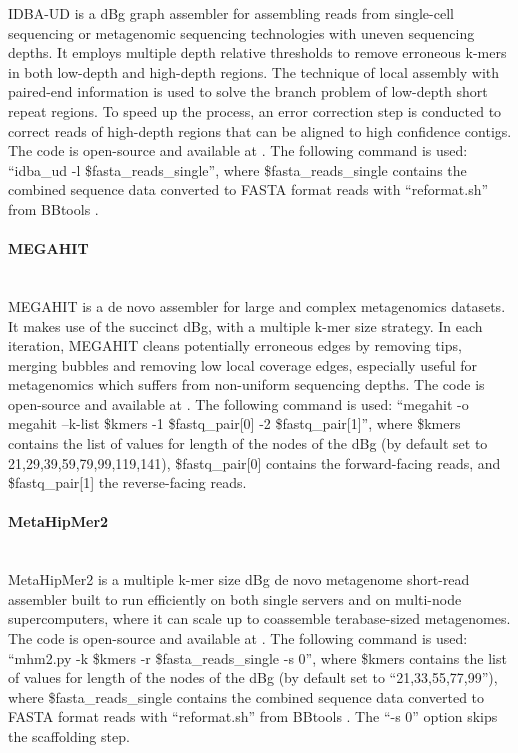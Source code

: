 IDBA-UD \cite{peng_idba-ud_2012} is a dBg graph assembler for assembling reads from single-cell sequencing or metagenomic sequencing technologies with uneven sequencing depths. It employs multiple depth relative thresholds to remove erroneous k-mers in both low-depth and high-depth regions. The technique of local assembly with paired-end information is used to solve the branch problem of low-depth short repeat regions. To speed up the process, an error correction step is conducted to correct reads of high-depth regions that can be aligned to high confidence contigs. The code is open-source and available at \cite{peng_loneknightpyidba_2022}. The following command is used:  “idba\_ud -l \$fasta\_reads\_single”, where \$fasta\_reads\_single contains the combined sequence data converted to FASTA format reads with “reformat.sh” from BBtools \cite{bushnell_bbmerge_2017}. 

\paragraph{MEGAHIT} \mbox{}\\

MEGAHIT \cite{li_megahit_2015} is a de novo assembler for large and complex metagenomics datasets. It makes use of the succinct dBg, with a multiple k-mer size strategy. In each iteration, MEGAHIT cleans potentially erroneous edges by removing tips, merging bubbles and removing low local coverage edges, especially useful for metagenomics which suffers from non-uniform sequencing depths. The code is open-source and available at \cite{li_megahit_2022}. The following command is used: “megahit -o megahit --k-list \$kmers -1 \$fastq\_pair[0] -2 \$fastq\_pair[1]”, where \$kmers contains the list of values for length of the nodes of the dBg (by default set to 21,29,39,59,79,99,119,141), \$fastq\_pair[0] contains the forward-facing reads, and \$fastq\_pair[1] the reverse-facing reads.

\paragraph{MetaHipMer2} \mbox{}\\

MetaHipMer2 \cite{georganas_extreme_2018} is a  multiple k-mer size dBg de novo metagenome short-read assembler built to run efficiently on both single servers and on multi-node supercomputers, where it can scale up to coassemble terabase-sized metagenomes. The code is open-source and available at \cite{noauthor_berkeleylab_nodate}. The following command is used: “mhm2.py -k \$kmers -r \$fasta\_reads\_single -s 0”, where \$kmers contains the list of values for length of the nodes of the dBg (by default set to “21,33,55,77,99”), where \$fasta\_reads\_single contains the combined sequence data converted to FASTA format reads with “reformat.sh” from BBtools \cite{bushnell_bbmerge_2017}. The “-s 0” option skips the scaffolding step. 

